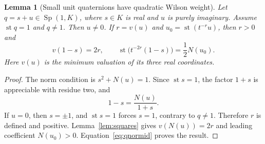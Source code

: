 \documentclass[11pt,oneside]{article}
\numberwithin{equation}{section}
\theoremstyle{plain}
\newtheorem{lemma}[theorem]{Lemma}
\theoremstyle{definition}
\theoremstyle{remark}
\newcommand{\st}{\operatorname{st}}
\newcommand{\Sp}{\operatorname{Sp}}
\begin{document}
\begin{lemma}[Small unit quaternions have quadratic Wilson weight]\label{lem:smallq}
Let $q=s+u\in\Sp(1,K)$, where $s\in K$ is real and $u$ is purely imaginary. Assume $\st q=1$ and $q\ne1$. Then $u\ne0$. If $r=v(u)$ and $u_0=\st(t^{-r}u)$, then $r>0$ and
\begin{equation}\label{eq:smallq}
 v(1-s)=2r,\qquad
 \st\bigl(t^{-2r}(1-s)\bigr)=\frac12 N(u_0).
\end{equation}
Here $v(u)$ is the minimum valuation of its three real coordinates.
\end{lemma}
\begin{proof}
The norm condition is $s^2+N(u)=1$. Since $\st s=1$, the factor $1+s$ is appreciable with residue two, and
\begin{equation}\label{eq:qnormid}
 1-s=\frac{N(u)}{1+s}.
\end{equation}
If $u=0$, then $s=\pm1$, and $\st s=1$ forces $s=1$, contrary to $q\ne1$. Therefore $r$ is defined and positive. Lemma~\ref{lem:squares} gives $v(N(u))=2r$ and leading coefficient $N(u_0)>0$. Equation~\eqref{eq:qnormid} proves the result.
\end{proof}
\end{document}
